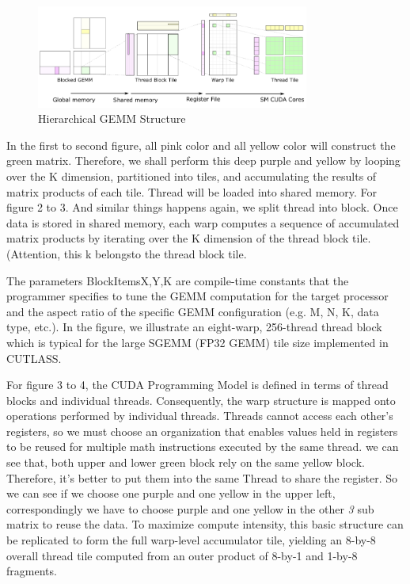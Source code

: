 \documentclass[UTF8]{article}
\begin{document}
    \begin{figure}[htbp]
    \caption{Hierarchical GEMM Structure}
    \centering
    \includegraphics[width=0.8\textwidth]{HGEMM.png}
    \end{figure}
    
    In the first to second figure, all pink color and all yellow color will construct the green matrix. Therefore, we shall perform this deep purple and yellow by looping over the K dimension, partitioned into tiles, and accumulating the results of matrix products of each tile. Thread will be loaded into shared memory. For figure 2 to 3. And similar things happens again, we split thread into block. Once data is stored in shared memory, each warp computes a sequence of accumulated matrix products by iterating over the K dimension of the thread block tile. (Attention, this k belongsto the thread block tile. 

    The parameters BlockItems{X,Y,K} are compile-time constants that the programmer specifies to tune the GEMM computation for the target processor and the aspect ratio of the specific GEMM configuration (e.g. M, N, K, data type, etc.). In the figure, we illustrate an eight-warp, 256-thread thread block which is typical for the large SGEMM (FP32 GEMM) tile size implemented in CUTLASS. 

    For figure 3 to 4, the CUDA Programming Model is defined in terms of thread blocks and individual threads. Consequently, the warp structure is mapped onto operations performed by individual threads. Threads cannot access each other’s registers, so we must choose an organization that enables values held in registers to be reused for multiple math instructions executed by the same thread. we can see that, both upper and lower green block rely on the same yellow block. Therefore, it's better to put them into the same Thread to share the register. So we can see if we choose one purple and one yellow in the upper left, correspondingly we have to choose purple and one yellow in the other \emph{3} sub matrix to reuse the data. To maximize compute intensity, this basic structure can be replicated to form the full warp-level accumulator tile, yielding an 8-by-8 overall thread tile computed from an outer product of 8-by-1 and 1-by-8 fragments.
\end{document}
